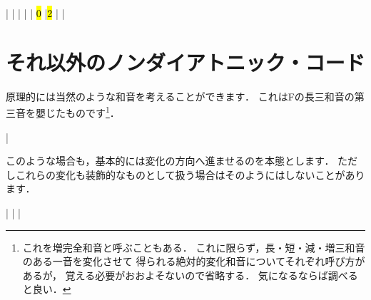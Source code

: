 \documentclass[dvipdfmx,uplatex,b5paper,openany,jbase=12Q,nomag*,textwidth-limit=44%
               ]{gachimuchi}[2020/05/05]
\begin{document}
\begin{Music}
  \generalmeter{\meterC}%
  \Startpiece
  \NOTes%
  |%
  \en%
  \NOtes%
  |%
  \en\bar%
  \NOTEs%
  |%
  \en\doublebar%
  \NOTes%
  |%
  \hl{0}%
  \en%
  \NOtes%
  |\hl{2}%
  \en\bar%
  \NOTEs%
  |%
  \en\setdoublebar%
  \endpiece%
\end{Music}

\section{それ以外のノンダイアトニック・コード}
原理的には当然のような和音を考えることができます．
これはFの長三和音の第三音を嬰じたものです\footnote{
  これを増完全和音と呼ぶこともある．
  これに限らず，長・短・減・増三和音のある一音を変化させて
  得られる絶対的変化和音についてそれぞれ呼び方があるが，
  覚える必要がおおよそないので省略する．
  気になるならば調べると良い．
}．
\begin{Music}[.3\linewidth]
  \Startpiece
  \Notes%
  \figbassuu[\txSharp]%
  |%
  \en\setdoublebar%
  \endpiece%
\end{Music}

このような場合も，基本的には変化の方向へ進ませるのを本態とします．
ただしこれらの変化も装飾的なものとして扱う場合はそのようにはしないことがあります．
\begin{Music}[.6\linewidth]
  \Startpiece
  \NOTes%
  \figbassuu[\txSharp]%
  |%
  \en\bar%
  \NOTes%
  \figbassuu[\txSharp][6]%
  \figbassuu[\txSharp]%
  |%
  \en\setdoublebar%
  \endpiece%
\end{Music}
\end{document}
